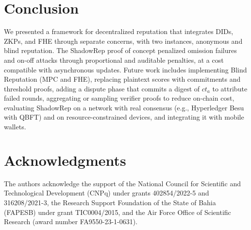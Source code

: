 \documentclass[conference]{IEEEtran}
\begin{document}
\section{Conclusion}\label{sec:conclusao-e-trab-fut}
We presented a framework for decentralized reputation that integrates DIDs, ZKPs, and FHE through separate concerns, with two instances, anonymous and blind reputation. The ShadowRep proof of concept penalized omission failures and on-off attacks through proportional and auditable penalties, at a cost compatible with asynchronous updates. Future work includes implementing Blind Reputation (MPC and FHE), replacing plaintext scores with commitments and threshold proofs, adding a dispute phase that commits a digest of $\mathit{ct}_a$ to attribute failed rounds, aggregating or sampling verifier proofs to reduce on-chain cost, evaluating ShadowRep on a network with real consensus (e.g., Hyperledger Besu with QBFT) and on resource-constrained devices, and integrating it with mobile wallets.

\section*{Acknowledgments}
The authors acknowledge the support of the National Council for Scientific and Technological Development (CNPq) under grants 402854/2022-5 and 316208/2021-3, the Research Support Foundation of the State of Bahia (FAPESB) under grant TIC0004/2015, and the Air Force Office of Scientific Research (award number FA9550-23-1-0631).



\end{document}
